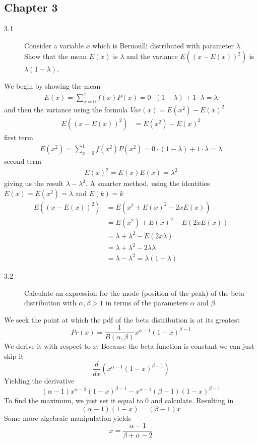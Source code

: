 \documentclass[10pt,a4paper]{article}
\newenvironment{prob}[1]%
   {%
    \begin{description}\item[#1]}%
   {\end{description}}
\begin{document}
\subsection{Chapter 3}
\begin{prob}{3.1}
  Consider a variable $x$ which is Bernoulli distributed with
  parameter $\lambda$. Show that the mean $E(x)$ is $\lambda$ and the
  variance $E((x - E(x))^2)$ is $\lambda(1 - \lambda)$.
\end{prob}
We begin by showing the mean
\begin{align}
  E(x) = \sum_{x=0}^1f(x)P(x) = 0\cdot(1-\lambda) + 1\cdot\lambda = \lambda
\end{align}
and then the variance using the formula $Var(x) = E(x^2) - E(x)^2$
\begin{align}
  E((x - E(x))^2) &= E(x^2) - E(x)^2
\end{align}
first term
\begin{align}
  E(x^2) = \sum_{x=0}^1f(x^2)P(x^2) = 0\cdot(1-\lambda) + 1\cdot\lambda = \lambda
\end{align}
second term
\begin{align}
  E(x)^2 = E(x)E(x) = \lambda^2
\end{align}
giving us the result $\lambda - \lambda^2$. A smarter method, using
the identities $E(x) = E(x^2) = \lambda$ and $E(k) = k$
\begin{align}
  E((x-E(x))^2) &= E(x^2 + E(x)^2 - 2xE(x))\\
  &= E(x^2) + E(x)^2 - E(2xE(x))\\
  &= \lambda + \lambda^2 - E(2x\lambda)\\
  &= \lambda + \lambda^2 - 2\lambda\lambda\\
  &= \lambda - \lambda^2 = \lambda(1-\lambda)
\end{align}
\begin{prob}{3.2}
  Calculate an expression for the mode (position of the peak) of the
  beta distribution with $\alpha, \beta > 1$ in terms of the
  parameters $\alpha$ and $\beta$.
\end{prob}
We seek the point at which the pdf of the beta distribution is at its
greatest
\begin{equation}
  Pr(x) = \frac{1}{B(\alpha, \beta)}x^{\alpha - 1}(1 - x)^{\beta - 1}
\end{equation}
We derive it with respect to $x$. Because the beta function is
constant we can just skip it
\begin{equation}
  \frac{d}{dx}\left(x^{\alpha - 1}(1 - x)^{\beta - 1}\right)
\end{equation}
Yielding the derivative
\begin{equation}
  (\alpha-1)x^{\alpha - 2}(1-x)^{\beta - 1} - x^{\alpha - 1}(\beta - 1)(1 - x)^{\beta - 1}
\end{equation}
To find the maximum, we just set it equal to 0 and calculate. Resulting in
\begin{equation}
  (\alpha - 1)(1 - x) = (\beta - 1)x
\end{equation}
Some more algebraic manipulation yields
\begin{equation}
  x = \frac{\alpha - 1}{\beta + \alpha - 2}
\end{equation}
\end{document}
